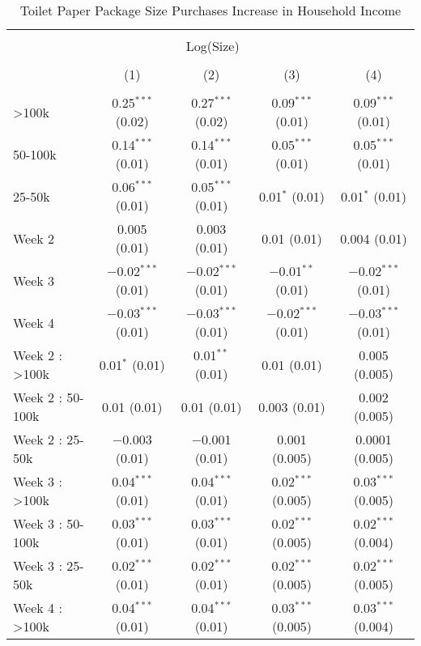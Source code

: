 
\begin{table}[!htbp] \centering 
  \caption{Toilet Paper Package Size Purchases Increase in Household Income} 
  \label{tab:packageSizeFullWeekLiquidity} 
\begin{tabular}{@{\extracolsep{5pt}}lcccc} 
\\[-1.8ex]\hline 
\hline \\[-1.8ex] 
 & \multicolumn{3}{c}{Log(Size)} &  \\ 
\\[-1.8ex] & (1) & (2) & (3) & (4)\\ 
\hline \\[-1.8ex] 
 >100k & 0.25$^{***}$ (0.02) & 0.27$^{***}$ (0.02) & 0.09$^{***}$ (0.01) & 0.09$^{***}$ (0.01) \\ 
  50-100k & 0.14$^{***}$ (0.01) & 0.14$^{***}$ (0.01) & 0.05$^{***}$ (0.01) & 0.05$^{***}$ (0.01) \\ 
  25-50k & 0.06$^{***}$ (0.01) & 0.05$^{***}$ (0.01) & 0.01$^{*}$ (0.01) & 0.01$^{*}$ (0.01) \\ 
  Week 2 & 0.005 (0.01) & 0.003 (0.01) & 0.01 (0.01) & 0.004 (0.01) \\ 
  Week 3 & $-$0.02$^{***}$ (0.01) & $-$0.02$^{***}$ (0.01) & $-$0.01$^{**}$ (0.01) & $-$0.02$^{***}$ (0.01) \\ 
  Week 4 & $-$0.03$^{***}$ (0.01) & $-$0.03$^{***}$ (0.01) & $-$0.02$^{***}$ (0.01) & $-$0.03$^{***}$ (0.01) \\ 
  Week 2 : >100k & 0.01$^{*}$ (0.01) & 0.01$^{**}$ (0.01) & 0.01 (0.01) & 0.005 (0.005) \\ 
  Week 2 : 50-100k & 0.01 (0.01) & 0.01 (0.01) & 0.003 (0.01) & 0.002 (0.005) \\ 
  Week 2 : 25-50k & $-$0.003 (0.01) & $-$0.001 (0.01) & 0.001 (0.005) & 0.0001 (0.005) \\ 
  Week 3 : >100k & 0.04$^{***}$ (0.01) & 0.04$^{***}$ (0.01) & 0.02$^{***}$ (0.005) & 0.03$^{***}$ (0.005) \\ 
  Week 3 : 50-100k & 0.03$^{***}$ (0.01) & 0.03$^{***}$ (0.01) & 0.02$^{***}$ (0.005) & 0.02$^{***}$ (0.004) \\ 
  Week 3 : 25-50k & 0.02$^{***}$ (0.01) & 0.02$^{***}$ (0.01) & 0.02$^{***}$ (0.005) & 0.02$^{***}$ (0.005) \\ 
  Week 4 : >100k & 0.04$^{***}$ (0.01) & 0.04$^{***}$ (0.01) & 0.03$^{***}$ (0.005) & 0.03$^{***}$ (0.004) \\ 

\end{tabular}
\end{table}
